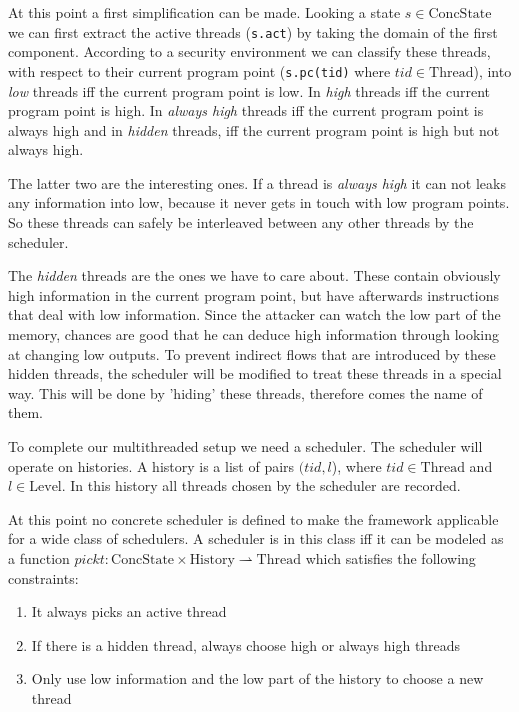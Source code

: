 \documentclass[a4paper,10pt]{llncs}
\begin{document}
At this point a first simplification can be made. Looking a state $s \in \text{ConcState}$ we can
first extract the active threads (\texttt{s.act}) by taking the domain of the first
component. According to a security environment we can classify these threads,
with respect to their current program point (\texttt{s.pc(tid)} where $tid \in \text{Thread}$),
into \textit{low} threads iff the current program point is low. In \textit{high}
threads iff the current program point is high. In \textit{always high} threads
iff the current program point is always high and in \textit{hidden} threads, iff
the current program point is high but not always high.

The latter two are the interesting ones. If a thread is \textit{always high} it
can not leaks any information into low, because it never gets in touch
with low program points. So these threads can safely be interleaved between any
other threads by the scheduler.

The \textit{hidden} threads are the ones we have to care about. These contain
obviously high information in the current program point, but have afterwards
instructions that deal with low information. Since the attacker can watch the
low part of the memory, chances are good that he can deduce high information
through looking at changing low outputs. To prevent indirect flows that are introduced by
these hidden threads, the scheduler will be modified to treat these threads
in a special way. This will be done by 'hiding' these threads, therefore comes
the name of them.

To complete our multithreaded setup we need a scheduler. The scheduler will
operate on histories. A history is a list of pairs $(tid, l$), where $tid \in
\text{Thread}$ and $l \in \text{Level}$. In this history all threads chosen by the scheduler
are recorded.

At this point no concrete scheduler is defined to make the framework applicable
for a wide class of schedulers. A scheduler is in this class iff it can be
modeled as a function $pickt: \text{ConcState} \times \text{History} \rightharpoonup \text{Thread}$
which satisfies the following constraints:

\begin{enumerate}
\item It always picks an active thread
\item If there is a hidden thread, always choose high or always high threads
\item Only use low information and the low part of the history to choose a
      new thread
\end{enumerate}
\end{document}
